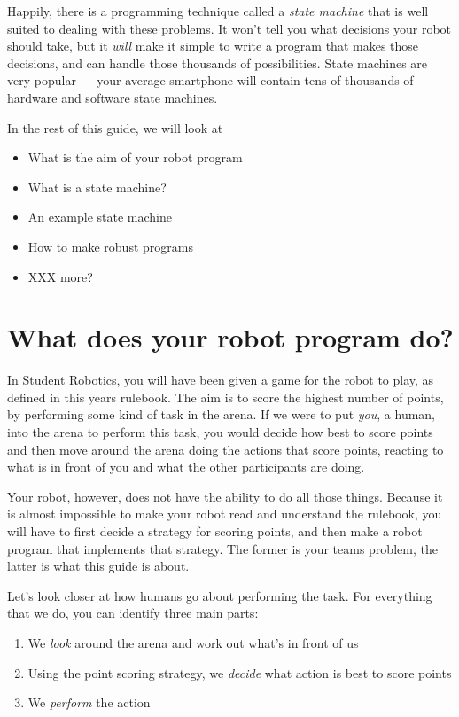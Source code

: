 \documentclass[a4paper,10pt]{article}
\begin{document}
Happily, there is a programming technique called a \textit{state machine} that
is well suited to dealing with these problems. It won't tell you what decisions
your robot should take, but it \textit{will} make it simple to write a program
that makes those decisions, and can handle those thousands of possibilities.
State machines are very popular --- your average smartphone will contain
tens of thousands of hardware and software state machines.

In the rest of this guide, we will look at
\begin{itemize}
	\item What is the aim of your robot program
	\item What is a state machine?
	\item An example state machine
	\item How to make robust programs
	\item XXX more?
\end{itemize}

\section{What does your robot program do?}

In Student Robotics, you will have been given a game for the robot to play, as
defined in this years rulebook. The aim is to score the highest number of
points, by performing some kind of task in the arena. If we were to put
\textit{you}, a human, into the arena to perform this task, you would decide
how best to score points and then move around the arena doing the actions that
score points, reacting to what is in front of you and what the other
participants are doing.

Your robot, however, does not have the ability to do all those things. Because
it is almost impossible to make your robot read and understand the rulebook,
you will have to first decide a strategy for scoring points, and then make a
robot program that implements that strategy. The former is your teams problem,
the latter is what this guide is about.

Let's look closer at how humans go about performing the task. For everything
that we do, you can identify three main parts:
\begin{enumerate}
	\item We \textit{look} around the arena and work out what's in front of us
	\item Using the point scoring strategy, we \textit{decide} what action is best to score points
	\item We \textit{perform} the action
\end{enumerate}
\end{document}
